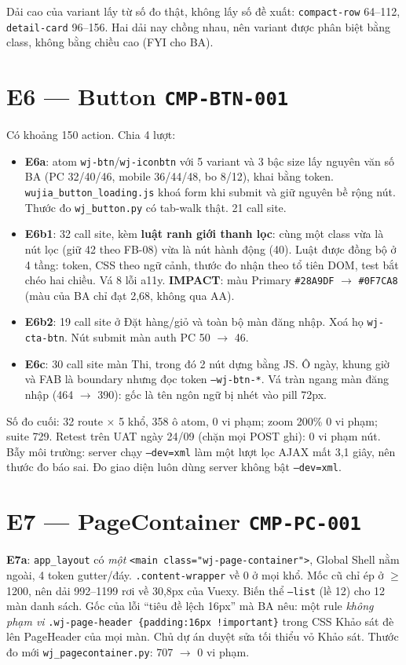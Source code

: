 Dải cao của variant lấy từ số đo thật, không lấy số đề xuất: \texttt{compact-row} 64--112,
\texttt{detail-card} 96--156. Hai dải nay chồng nhau, nên variant được phân biệt bằng class, không bằng
chiều cao (FYI cho BA).

\section{E6 --- Button \texttt{CMP-BTN-001}}

Có khoảng 150 action. Chia 4 lượt:
\begin{itemize}[nosep]
\item \textbf{E6a}: atom \texttt{wj-btn}/\texttt{wj-iconbtn} với 5 variant và 3 bậc size lấy nguyên văn
  số BA (PC 32/40/46, mobile 36/44/48, bo 8/12), khai bằng token. \texttt{wujia\_button\_loading.js} khoá
  form khi submit và giữ nguyên bề rộng nút. Thước đo \texttt{wj\_button.py} có tab-walk thật.
  21 call site.
\item \textbf{E6b1}: 32 call site, kèm \textbf{luật ranh giới thanh lọc}: cùng một class vừa là nút lọc
  (giữ 42 theo FB-08) vừa là nút hành động (40). Luật được đồng bộ ở 4 tầng: token, CSS theo ngữ cảnh,
  thước đo nhận theo tổ tiên DOM, test bắt chéo hai chiều. Vá 8 lỗi a11y. \textbf{IMPACT}: màu Primary
  \texttt{\#28A9DF} $\to$ \texttt{\#0F7CA8} (màu của BA chỉ đạt 2,68, không qua AA).
\item \textbf{E6b2}: 19 call site ở Đặt hàng/giỏ và toàn bộ màn đăng nhập. Xoá họ \texttt{wj-cta-btn}.
  Nút submit màn auth PC 50 $\to$ 46.
\item \textbf{E6c}: 30 call site màn Thi, trong đó 2 nút dựng bằng JS. Ô ngày, khung giờ và FAB là
  boundary nhưng đọc token \texttt{--wj-btn-*}. Vá tràn ngang màn đăng nhập (464 $\to$ 390): gốc là tên
  ngôn ngữ bị nhét vào pill 72px.
\end{itemize}
Số đo cuối: 32 route × 5 khổ, 358 ô atom, 0 vi phạm; zoom 200\% 0 vi phạm; suite 729. Retest trên UAT
ngày 24/09 (chặn mọi POST ghi): 0 vi phạm nút. Bẫy môi trường: server chạy \texttt{--dev=xml} làm một
lượt lọc AJAX mất 3,1 giây, nên thước đo báo sai. Đo giao diện luôn dùng server không bật \texttt{--dev=xml}.

\section{E7 --- PageContainer \texttt{CMP-PC-001}}

\textbf{E7a}: \texttt{app\_layout} có \emph{một} \texttt{<main class="wj-page-container">}, Global Shell nằm
ngoài, 4 token gutter/đáy. \texttt{.content-wrapper} về 0 ở mọi khổ. Mốc cũ chỉ ép ở $\geq$1200, nên
dải 992--1199 rơi về 30,8px của Vuexy. Biến thể \texttt{--list} (lề 12) cho 12 màn danh sách. Gốc của lỗi
``tiêu đề lệch 16px'' mà BA nêu: một rule \emph{không phạm vi}
\texttt{.wj-page-header \{padding:16px !important\}} trong CSS Khảo sát đè lên PageHeader của mọi màn.
Chủ dự án duyệt sửa tối thiểu vỏ Khảo sát. Thước đo mới \texttt{wj\_pagecontainer.py}: 707 $\to$ 0 vi phạm.

